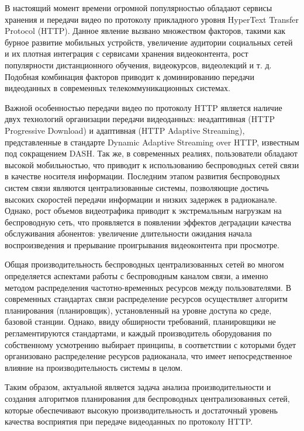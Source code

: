 {\actuality}
В настоящий момент времени огромной популярностью обладают сервисы хранения и передачи видео по протоколу прикладного уровня HyperText Transfer Protocol (HTTP). Данное явление вызвано множеством факторов, такими как бурное развитие мобильных устройств, увеличение аудитории социальных сетей и их плотная интеграция с сервисами хранения видеоконтента, рост популярности дистанционного обучения, видеокурсов, видеолекций и т. д. Подобная комбинация факторов приводит к доминированию передачи видеоданных в современных телекоммуникационных системах.

Важной особенностью передачи видео по протоколу HTTP является наличие двух технологий организации передачи видеоданных: неадаптивная (HTTP Progressive Download) и адаптивная (HTTP Adaptive Streaming), представленные в стандарте Dynamic Adaptive Streaming over HTTP, известным под сокращением DASH. Так же, в современных реалиях, пользователи обладают высокой мобильностью, что приводит к использованию беспроводных сетей связи в качестве носителя информации. Последним этапом развития беспроводных систем связи являются централизованные системы, позволяющие достичь высоких скоростей передачи информации и низких задержек в радиоканале. Однако, рост объемов видеотрафика приводит к экстремальным нагрузкам на беспроводную сеть, что проявляется в появлении эффектов деградации качества обслуживания абонентов: увеличение длительности ожидания начала воспроизведения и прерывание проигрывания видеоконтента при просмотре.

Общая производительность беспроводных централизованных сетей во многом определяется аспектами работы с беспроводным каналом связи, а именно методом распределения частотно-временных ресурсов между пользователями. В современных стандартах связи распределение ресурсов осуществляет алгоритм планирования (планировщик), установленный на уровне доступа ко среде, базовой станции. Однако, ввиду обширности требований, планировщики не регламентируются стандартами, и каждый производитель оборудования по собственному усмотрению выбирает принципы, в соответствии с которыми будет организовано распределение ресурсов радиоканала, что имеет непосредственное влияние на производительность системы в целом.

Таким образом, актуальной является задача анализа производительности и создания алгоритмов планирования для беспроводных централизованных сетей, которые обеспечивают высокую производительность и достаточный уровень качества восприятия при передаче видеоданных по протоколу HTTP.

